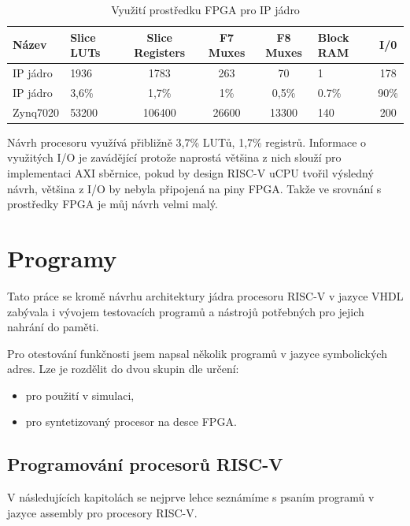 \documentclass[FM,BP]{tulthesis}
\begin{document}
\begin{table}[h]
    \caption{Využití prostředku FPGA pro IP jádro}
    \label{table:IP_core_resources}
    \begin{center}
        \begin{tabular}{|l|p{1.5cm}|c|c|c|p{1.5cm}|c|}
        \hline
        \textbf{Název} & 
        \textbf{Slice LUTs} & 
        \textbf{Slice Registers} & 
        \textbf{F7 Muxes} & 
        \textbf{F8 Muxes} & 
        \textbf{Block RAM} & 
        \textbf{I/0} \\
        \hline
        IP jádro & 1936 & 1783 & 263 & 70 & 1 & 178 \\
        \hline
        IP jádro & 3,6\% & 1,7\% & 1\% & 0,5\% & 0.7\% & 90\% \\
        \hline
        Zynq7020 & 53200 & 106400 & 26600 & 13300 & 140 & 200\\
        \hline
        \end{tabular}
    \end{center}
\end{table}

Návrh procesoru využívá přibližně 3,7\% LUTů, 1,7\% registrů. Informace o využitých I/O je zavádějící protože naprostá většina z nich slouží pro implementaci AXI sběrnice, pokud by design RISC-V uCPU tvořil výsledný návrh, většina z I/O by nebyla připojená na piny FPGA. Takže ve srovnání s prostředky FPGA je můj návrh velmi malý. 

\chapter{Programy}\label{kap:Programy}
Tato práce se kromě návrhu architektury jádra procesoru RISC-V v jazyce VHDL zabývala i vývojem testovacích programů a nástrojů potřebných pro jejich nahrání do paměti.

Pro otestování funkčnosti jsem napsal několik programů v jazyce symbolických adres. Lze je rozdělit do dvou skupin dle určení:
\begin{itemize}
    \item pro použití v simulaci,
    \item pro syntetizovaný procesor na desce FPGA.
\end{itemize}

\section{Programování procesorů RISC-V}
V následujících kapitolách se nejprve lehce seznámíme s psaním programů v jazyce assembly pro procesory RISC-V.
\end{document}

